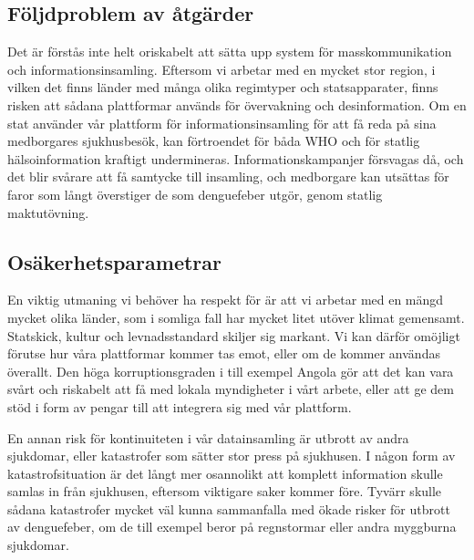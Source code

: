 \documentclass{article}
\begin{document}
\subsection{Följdproblem av åtgärder}

Det är förstås inte helt oriskabelt att sätta upp system för masskommunikation och informationsinsamling. Eftersom vi arbetar med en mycket stor region, i vilken det finns länder med många olika regimtyper och statsapparater, finns risken att sådana plattformar används för övervakning och desinformation. Om en stat använder vår plattform för informationsinsamling för att få reda på sina medborgares sjukhusbesök, kan förtroendet för båda WHO och för statlig hälsoinformation kraftigt undermineras. Informationskampanjer försvagas då, och det blir svårare att få samtycke till insamling, och medborgare kan utsättas för faror som långt överstiger de som denguefeber utgör, genom statlig maktutövning.

\subsection{Osäkerhetsparametrar}

En viktig utmaning vi behöver ha respekt för är att vi arbetar med en mängd mycket olika länder, som i somliga fall har mycket litet utöver klimat gemensamt. Statskick, kultur och levnadsstandard skiljer sig markant. Vi kan därför omöjligt förutse hur våra plattformar kommer tas emot, eller om de kommer användas överallt. Den höga korruptionsgraden i till exempel Angola \cite{corruption:angola} gör att det kan vara svårt och riskabelt att få med lokala myndigheter i vårt arbete, eller att ge dem stöd i form av pengar till att integrera sig med vår plattform. 

En annan risk för kontinuiteten i vår datainsamling är utbrott av andra sjukdomar, eller katastrofer som sätter stor press på sjukhusen. I någon form av katastrofsituation är det långt mer osannolikt att komplett information skulle samlas in från sjukhusen, eftersom viktigare saker kommer före. Tyvärr skulle sådana katastrofer mycket väl kunna sammanfalla med ökade risker för utbrott av denguefeber, om de till exempel beror på regnstormar eller andra myggburna sjukdomar.


\section{}
\end{document}
